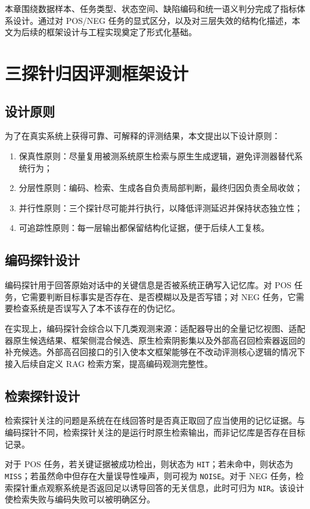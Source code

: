 本章围绕数据样本、任务类型、状态空间、缺陷编码和统一语义判分完成了指标体系设计。通过对 POS/NEG 任务的显式区分，以及对三层失效的结构化描述，本文为后续的框架设计与工程实现奠定了形式化基础。

\chapter{三探针归因评测框架设计}

\section{设计原则}

为了在真实系统上获得可靠、可解释的评测结果，本文提出以下设计原则：

\begin{enumerate}
    \item 保真性原则：尽量复用被测系统原生检索与原生生成逻辑，避免评测器替代系统行为；
    \item 分层性原则：编码、检索、生成各自负责局部判断，最终归因负责全局收敛；
    \item 并行性原则：三个探针尽可能并行执行，以降低评测延迟并保持状态独立性；
    \item 可追踪性原则：每一层输出都保留结构化证据，便于后续人工复核。
\end{enumerate}

\section{编码探针设计}

编码探针用于回答原始对话中的关键信息是否被系统正确写入记忆库。对 POS 任务，它需要判断目标事实是否存在、是否模糊以及是否写错；对 NEG 任务，它需要检查系统是否误写入了本不该存在的伪记忆。

在实现上，编码探针会综合以下几类观测来源：适配器导出的全量记忆视图、适配器原生候选结果、框架侧混合候选、原生检索阴影集以及外部高召回检索器返回的补充候选。外部高召回接口的引入使本文框架能够在不改动评测核心逻辑的情况下接入后续自定义 RAG 检索方案，提高编码观测完整性。

\section{检索探针设计}

检索探针关注的问题是系统在在线回答时是否真正取回了应当使用的记忆证据。与编码探针不同，检索探针关注的是运行时原生检索输出，而非记忆库是否存在目标记录。

对于 POS 任务，若关键证据被成功检出，则状态为 \texttt{HIT}；若未命中，则状态为 \texttt{MISS}；若虽然命中但存在大量误导性噪声，则可视为 \texttt{NOISE}。对于 NEG 任务，检索探针重点观察系统是否返回足以诱导回答的无关信息，此时可归为 \texttt{NIR}。该设计使检索失败与编码失败可以被明确区分。

